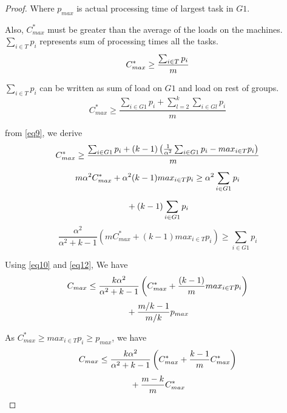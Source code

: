 \documentclass[10pt, conference, compsocconf]{IEEEtran}
\begin{document}
\begin{proof}
  Where $p_{max}$ is actual processing time of largest task in $G1$.

  Also, $C_{max}^{*}$ must be greater than the average of the loads on
  the machines. $\sum_{i \in T }{{p_{i}}}$ represents sum of
  processing times all the tasks.
  \begin{equation}{\nonumber}
    C_{max}^{*} \geq  \frac{\sum_{i \in T }^{}{{p_{i}}}}{m}
  \end{equation}

  $\sum_{i \in T }{{p_{i}}}$ can be written as sum of load on $G1$ and
  load on rest of groups.
  \begin{equation}\label{eq11}
    C_{max}^{*} \geq  \frac{\sum_{i \in G1 }^{}{{p_{i}}}+ \sum_{l=2}^{k}\sum_{i \in Gl }^{}{{p_{i}}}}{m}
  \end{equation}

  from \ref{eq9}, we derive
  \begin{equation}{\nonumber}
    C_{max}^{*} \geq  \frac{\sum_{i \in G1 }^{}{{p_{i}}}+ (k-1)\left(\frac{1}{\alpha^{2}}\sum_{i \in G1 }^{}{{p_{i}}}-  {max_{i \in T}}{{p_{i}}}\right)}{m}
  \end{equation}
  \begin{equation}{\nonumber}
    m\alpha^{2}C_{max}^{*} + \alpha^{2} (k-1){max_{i \in T}}{{p_{i}}} \geq  \alpha^{2}\sum_{i \in G1 }^{}{{p_{i}}}  
  \end{equation}
  \begin{equation}{\nonumber}
    + (k-1)\sum_{i \in G1 }^{}{{p_{i}}} 
  \end{equation}
  \begin{equation}\label{eq12}
    \frac{\alpha^{2}}{\alpha^{2}+k-1}\left(m C_{max}^{*}+(k-1) {max_{i \in T}}{{p_{i}}}\right) \geq \sum_{i \in G1 }^{}{{p_{i}}}  
  \end{equation}
  
  Using \ref{eq10} and \ref{eq12}, We have
  \begin{equation}{\nonumber}
    C_{max} \leq \frac{k\alpha^{2}}{\alpha^{2}+k-1}\left( C_{max}^{*}+\frac{(k-1)}{m} {max_{i \in T}}{{p_{i}}}\right)
  \end{equation}
  \begin{equation}{\nonumber}
    + {\frac{m/k-1}{m/k}} p_{max} 
  \end{equation}
  
  As $C_{max}^{*}\geq {{max_{i \in T}}{p_{i}}}\geq p_{max}$, we have
  \begin{equation}{\nonumber}
    C_{max} \leq \frac{k\alpha^{2}}{\alpha^{2}+k-1}\left( C_{max}^{*}+ {\frac{k-1}{m}}{C_{max}^{*}}\right)
  \end{equation}
  \begin{equation}{\nonumber}
    + {\frac{m-k}{m}} C_{max}^{*} 
  \end{equation}    
  

\end{proof}
\end{document}
